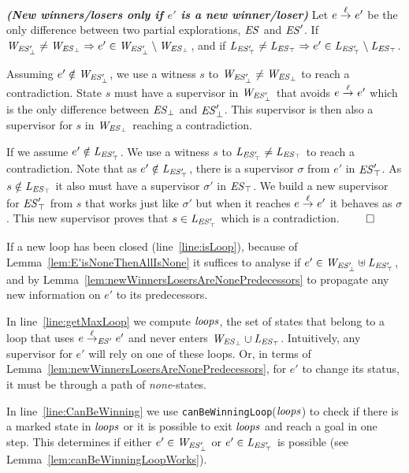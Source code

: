 \begin{lemma}\textbf{\emph{(New winners/losers only if $e'$ 
is a new winner/loser)}}
\label{lem:E'isNoneThenAllIsNone}
Let $e \overset{\ell}{\rightarrow}_{} e'$ be the only difference between two partial explorations, $\mathit{ES}$ and $\mathit{ES}'$. If $\mathit{W_{\mathit{\mathit{ES}'_{\bot}}}} \neq \mathit{W_{\mathit{\mathit{ES}_{\bot}}}} \Rightarrow e' \in \mathit{W_{\mathit{\mathit{ES}'_{\bot}}}} \setminus \mathit{W_{\mathit{\mathit{ES}_{\bot}}}}$, and if $\mathit{L_{\mathit{\mathit{ES}'_{\top}}}} \neq \mathit{L_{\mathit{\mathit{ES}_{\top}}}} \Rightarrow e' \in \mathit{L_{\mathit{\mathit{ES}'_{\top}}}} \setminus \mathit{L_{\mathit{\mathit{ES}_{\top}}}}$.
\end{lemma}

\begin{Proof Sketch}
Assuming $e' \notin \mathit{W_{\mathit{\mathit{ES}'_{\bot}}}}$, we use a witness $s$ to $\mathit{W_{\mathit{\mathit{ES}'_{\bot}}}} \neq 
\mathit{W_{\mathit{\mathit{ES}_{\bot}}}}$ to reach a contradiction. State $s$ must have a supervisor in 
$\mathit{W_{\mathit{\mathit{ES}'_{\bot}}}}$  that avoids $e \overset{\ell}{\rightarrow}_{} e'$ which is the only difference 
between $\mathit{\mathit{ES}_{\bot}}$ and 
$\mathit{\mathit{ES}'_{\bot}}$. This supervisor is then also a 
supervisor for $s$ in $\mathit{W_{\mathit{\mathit{ES}_{\bot}}}}$ reaching a contradiction. 

If we assume $e' \notin \mathit{L_{\mathit{\mathit{ES}'_{\top}}}}$.  We use a witness $s$ to $\mathit{L_{\mathit{\mathit{ES}'_{\top}}}} 
\neq 
\mathit{L_{\mathit{\mathit{ES}_{\top}}}}$ to reach a contradiction. Note that as $e' \notin \mathit{L_{\mathit{\mathit{ES}'_{\top}}}}$, there 
is a supervisor $\sigma$ from $e'$ in  
$\mathit{\mathit{ES}'_{\top}}$.  As $s \notin \mathit{L_{\mathit{\mathit{ES}_{\top}}}}$ it also must 
have a 
supervisor $\sigma'$ in  $\mathit{\mathit{ES}_{\top}}$. We build 
a 
new supervisor for $\mathit{\mathit{ES}'_{\top}}$ from $s$ that 
works just like $\sigma'$ but when it reaches $e \overset{\ell}{\rightarrow}_{} e'$ it 
behaves as $\sigma$. This new supervisor proves that $s \in \mathit{L_{\mathit{\mathit{ES}'_{\top}}}}$ 
which is a contradiction. \hfill$\qed$
\end{Proof Sketch}

If a new loop has been closed (line~\ref{line:isLoop}), because of 
Lemma~\ref{lem:E'isNoneThenAllIsNone} it suffices to analyse if $e' 
\in \mathit{W_{\mathit{\mathit{ES}'_{\bot}}}} \uplus \mathit{L_{\mathit{\mathit{ES}'_{\top}}}}$, and by 
Lemma~\ref{lem:newWinnersLosersAreNonePredecessors} to 
propagate any new information on $e'$ to its predecessors. 

In line~\ref{line:getMaxLoop} we compute $\mathit{loops}$, the set of states that belong to a 
loop that uses $e \overset{\ell}{\rightarrow}_{\mathit{ES}'} e'$ and never enters $\mathit{W_{\mathit{\mathit{ES}_{\bot}}}} \cup \mathit{L_{\mathit{\mathit{ES}_{\top}}}}$. 
Intuitively, any supervisor for $e'$ will rely on one of these loops. Or, in terms of 
Lemma~\ref{lem:newWinnersLosersAreNonePredecessors}, for $e'$ to change its 
status, it must be through a path of \textit{none}-states. 

In line~\ref{line:CanBeWinning} we use \texttt{canBeWinningLoop}($\mathit{loops}$) to 
check 
if there is a marked state in $\mathit{loops}$ or it is possible to exit $\mathit{loops}$ and reach a goal 
in one step. This determines if 
either $e' \in \mathit{W_{\mathit{\mathit{ES}'_{\bot}}}}$ or $e' \in \mathit{L_{\mathit{\mathit{ES}'_{\top}}}}$ is possible (see 
Lemma~\ref{lem:canBeWinningLoopWorks}). 

